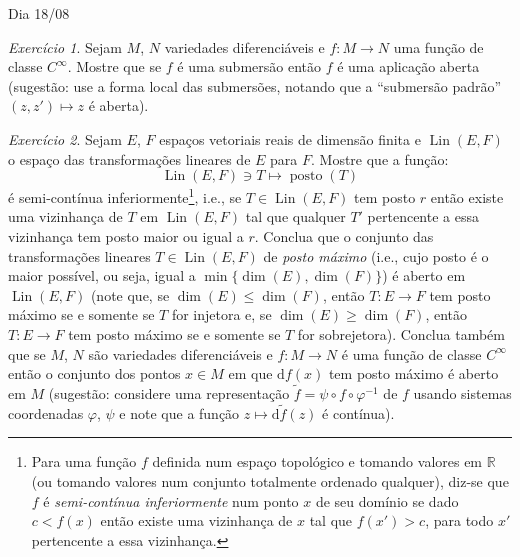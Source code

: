 \documentclass[oneside,11pt]{amsart}
\newcommand{\R}{\mathds R}
\newcommand{\dd}{\mathrm d}
\DeclareMathOperator{\Lin}{Lin}
\DeclareMathOperator{\posto}{posto}
\DeclareMathOperator{\Dim}{dim}
\theoremstyle{remark}\newtheorem{exercise}{Exercício}[section]
\theoremstyle{plain}\newtheorem{teo}{Teorema}[section]
\theoremstyle{plain}\newtheorem{lem}[teo]{Lema}
\theoremstyle{plain}\newtheorem{prop}[teo]{Proposição}
\theoremstyle{definition}\newtheorem{defin}[teo]{Definição}
\theoremstyle{remark}\newtheorem{rem}[teo]{Observação}
\theoremstyle{definition}\newtheorem{example}[teo]{Exemplo}
\numberwithin{equation}{section}
\begin{document}
\begin{section}{Dia 18/08}
\begin{exercise}\label{exe:submersaberta}
Sejam $M$, $N$ variedades diferenciáveis e $f:M\to N$ uma função de classe $C^\infty$. Mostre que se $f$ é uma submersão
então $f$ é uma aplicação aberta (sugestão: use a forma local das submersões, notando que a ``submersão padrão''
$(z,z')\mapsto z$ é aberta).
\end{exercise}

\begin{exercise}
Sejam $E$, $F$ espaços vetoriais reais de dimensão finita e $\Lin(E,F)$ o espaço das transformações lineares
de $E$ para $F$. Mostre que a função:
\[\Lin(E,F)\ni T\longmapsto\posto(T)\]
é semi-contínua inferiormente\footnote{%
Para uma função $f$ definida num espaço topológico e tomando valores em $\R$ (ou tomando valores num conjunto totalmente
ordenado qualquer), diz-se que $f$ é {\em semi-contínua inferiormente\/} num ponto $x$ de seu domínio se dado
$c<f(x)$ então existe uma vizinhança de $x$ tal que $f(x')>c$, para todo $x'$ pertencente a essa vizinhança.},
i.e., se $T\in\Lin(E,F)$ tem posto $r$ então existe uma vizinhança de $T$ em $\Lin(E,F)$ tal que qualquer $T'$ pertencente
a essa vizinhança tem posto maior ou igual a $r$. Conclua que o conjunto das transformações lineares $T\in\Lin(E,F)$
de {\em posto máximo\/} (i.e., cujo posto é o maior possível, ou seja, igual a $\min\{\Dim(E),\Dim(F)\}$)
é aberto em $\Lin(E,F)$ (note que, se $\Dim(E)\le\Dim(F)$, então $T:E\to F$ tem posto máximo se e somente se $T$ for injetora
e, se $\Dim(E)\ge\Dim(F)$, então $T:E\to F$ tem posto máximo se e somente se $T$ for sobrejetora).
Conclua também que se $M$, $N$ são variedades diferenciáveis e $f:M\to N$ é uma função de classe $C^\infty$ então o conjunto
dos pontos $x\in M$ em que $\dd f(x)$ tem posto máximo é aberto em $M$ (sugestão: considere uma representação
$\tilde f=\psi\circ f\circ\varphi^{-1}$ de $f$ usando sistemas coordenadas $\varphi$, $\psi$ e note que a função
$z\mapsto\dd\tilde f(z)$ é contínua).
\end{exercise}

\end{section}
\end{document}
